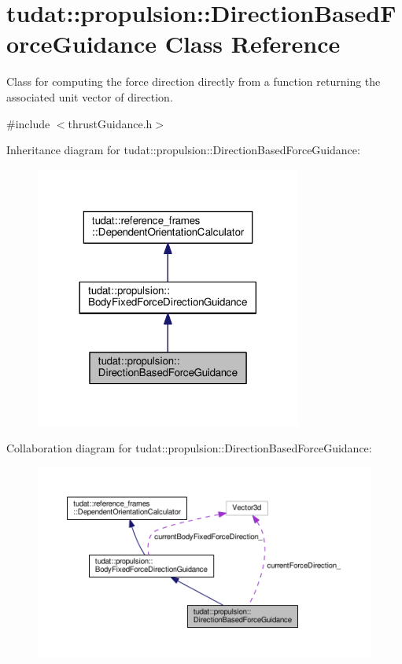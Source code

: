\hypertarget{classtudat_1_1propulsion_1_1DirectionBasedForceGuidance}{}\section{tudat\+:\+:propulsion\+:\+:Direction\+Based\+Force\+Guidance Class Reference}
\label{classtudat_1_1propulsion_1_1DirectionBasedForceGuidance}


Class for computing the force direction directly from a function returning the associated unit vector of direction.  




{\ttfamily \#include $<$thrust\+Guidance.\+h$>$}



Inheritance diagram for tudat\+:\+:propulsion\+:\+:Direction\+Based\+Force\+Guidance\+:
\nopagebreak
\begin{figure}[H]
\begin{center}
\leavevmode
\includegraphics[width=248pt]{classtudat_1_1propulsion_1_1DirectionBasedForceGuidance__inherit__graph}
\end{center}
\end{figure}


Collaboration diagram for tudat\+:\+:propulsion\+:\+:Direction\+Based\+Force\+Guidance\+:
\nopagebreak
\begin{figure}[H]
\begin{center}
\leavevmode
\includegraphics[width=350pt]{classtudat_1_1propulsion_1_1DirectionBasedForceGuidance__coll__graph}
\end{center}
\end{figure}
